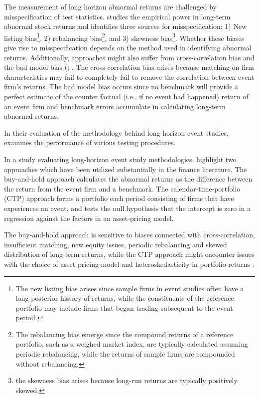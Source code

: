 The measurement of long horizon abnormal returns are challenged by misspecification of test statistics. \cite{Lyon_1997_test_stats} studies the empirical power in long-term abnormal stock returns and identifies three sources for misspecification: 1) New listing bias\footnote{The new listing bias arises since sample firms in event studies often have a long posterior history of returns, while the constituents of the reference portfolio may include firms that began trading subsequent to the event period.}, 2) rebalancing bias\footnote{The rebalancing bias emerge since the compound returns of a reference portfolio, such as a weighed market index, are typically calculated assuming periodic rebalancing, while the returns of sample firms are compounded without rebalancing. }, and 3) skewness bias\footnote{ the skewness bias arises because long-run returns are typically positively skewed.}. Whether these biases give rise to misspecification depends on the method used in identifying abnormal returns. Additionally, approaches might also suffer from cross-correlation bias and the bad model bias (\citep{fama1998_events}; \citep{mitchell2000managerial}. The cross-correlation bias arises because matching on firm characteristics may fail to completely fail to remove the correlation between event firm's returns. The bad model bias occurs since no benchmark will provide a perfect estimate of the counter factual (i.e., if no event had happened) return of an event firm and benchmark errors accumulate in calculating long-term abnormal returns.

In their evaluation of the methodology behind long-horizon event studies,  examines the performance of various testing procedures.

In a study evaluating long-horizon event study methodologies, \cite{Ang_event_method} highlight two approaches which have been utilized substantially in the finance literature. The buy-and-hold approach calculates the abnormal returns as the difference between the return from the event firm and a benchmark. The calendar-time-portfolio (CTP) approach forms a portfolio each period consisting of firms that have experiences an event, and tests the null hypothesis that the intercept is zero in a regression against the factors in an asset-pricing model.

The buy-and-hold approach is sensitive to biases connected with cross-correlation, insufficient matching, new equity issues, periodic rebalancing and skewed distribution of long-term returns, while the CTP approach might encounter issues with the choice of asset pricing model and heteroskedasticity in portfolio returns \citep{Ang_event_method}.  


